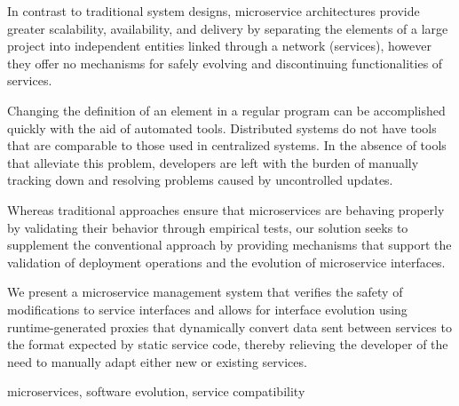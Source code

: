 
%

In contrast to traditional system designs, microservice architectures provide greater
scalability, availability, and delivery by separating the elements of a large project into independent entities linked through a network (services), however they offer no
mechanisms for safely evolving and discontinuing functionalities of services.

Changing the definition of an element in a regular program can be accomplished quickly with the aid of automated tools.
Distributed systems do not have tools that are comparable to those used in centralized systems.
In the absence of tools that alleviate this problem,
developers are left with the burden of manually tracking down and resolving problems caused by uncontrolled updates.

Whereas traditional approaches ensure that microservices are behaving properly by validating their behavior through empirical tests,
our solution seeks to supplement the conventional approach by providing mechanisms that support the validation of deployment operations and the evolution of microservice interfaces.

We present a microservice management system that verifies the safety of modifications to service interfaces
and allows for interface evolution using runtime-generated proxies that dynamically convert data sent between services to the format expected by static service code,
thereby relieving the developer of the need to manually adapt either new or existing services.

\begin{keywords}
    microservices, software evolution, service compatibility
\end{keywords} 
